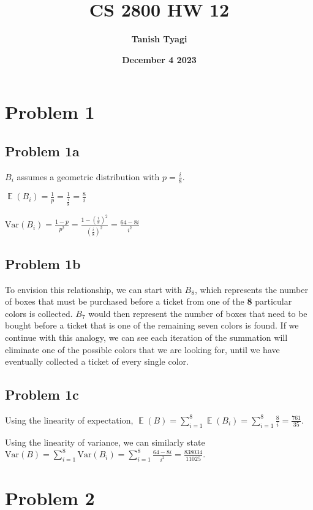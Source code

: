 \documentclass{article}
\title{\textbf{CS 2800 HW 12}}
\author{\textbf{Tanish Tyagi}}
\date{\textbf{December 4 2023}}
\newcommand{\Var}{\mathrm{Var}}
\DeclareMathOperator{\EX}{\mathbb{E}}
\begin{document}
\maketitle

\section{Problem 1}

\subsection{Problem 1a}

$B_i$ assumes a geometric distribution with $p = \frac{i}{8}$.

\noindent $\EX(B_i) = \frac{1}{p} = \frac{1}{\frac{i}{8}} = \frac{8}{i}$

\noindent $\Var(B_i) = \frac{1 - p}{p^2} = \frac{1 - (\frac{i}{8})^2}{(\frac{i}{8})^2} = \frac{64 - 8i}{i^2}$

\subsection{Problem 1b}

To envision this relationship, we can start with $B_8$, which represents the number of boxes that must be purchased before a ticket from one of the \textbf{8} particular colors is collected. 
$B_7$ would then represent the number of boxes that need to be bought before a ticket that is one of the remaining seven colors is found. If we continue with this analogy, we can see each iteration of the summation will eliminate one of the possible colors that we are looking for, until we have eventually collected a ticket of every single color.

\subsection{Problem 1c}

Using the linearity of expectation, $\EX(B) = \sum_{i = 1}^{8} \EX(B_i) = \sum_{i = 1}^{8} \frac{8}{i} = \frac{761}{35}$.

\noindent Using the linearity of variance, we can similarly state $\Var(B) = \sum_{i = 1}^{8}\Var(B_i) = \sum_{i = 1}^{8}\frac{64 - 8i}{i^2} = \frac{838034}{11025}$.

\section{Problem 2}
\end{document}
